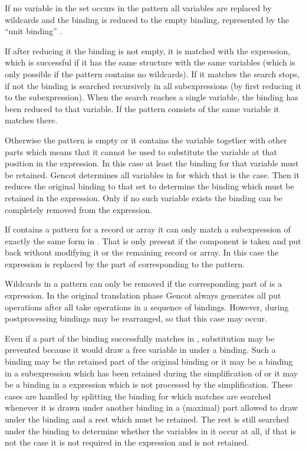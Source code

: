 If no variable in the set occurs in the pattern all variables are replaced by wildcards and the binding is reduced to the 
empty binding, represented by the ``unit binding'' \code{() = ()}.

If after reducing it the binding is not empty, it is matched with the expression, which is successful if it has the same structure with the same
variables (which is only possible if the pattern contains no wildcards). If it matches the search stops, if not the binding 
is searched recursively in all subexpressions (by first reducing it to the subexpression). When the search reaches a single 
variable, the binding has been reduced to that variable. If the pattern consists of the same variable it matches there.

Otherwise the pattern is empty or it contains the variable together with other parts which means that it cannot be used to substitute the 
variable at that position in the expression. In this case at least the binding for that variable must be retained. Gencot 
determines all variables in  for which that is the case. Then it reduces the original binding 
to that set to determine the binding  which must be retained in the  expression. Only if no
such variable exists the binding can be completely removed from the  expression.

If  contains a  pattern for a record or array it can only match a  subexpression 
of exactly the same form in . That is only present if the component is taken and put back without modifying it or the 
remaining record or array. In this case the  expression is replaced by the part of  corresponding to 
the  pattern.

Wildcards in a  pattern can only be removed if the corresponding part of  is a  expression. 
In the original translation phase Gencot always generates all put operations after all take operations in a sequence of bindings.
However, during postprocessing bindings may be rearranged, so that this case may occur.

Even if a part of the binding successfully matches in , substitution may be prevented because it would draw a 
free variable in  under a binding. Such a binding may be the retained part of the original binding or it may 
be a binding in a  subexpression which has been retained during the simplification of 
or it may be a binding in a  expression which is not processed by the simplification. These cases are handled
by splitting the binding for which matches are searched whenever it is drawn under another binding in a (maximal) part allowed
to draw under the binding and a rest which must be retained. The rest is still searched under the binding to determine whether
the variables in it occur at all, if that is not the case it is not required in the expression and is not retained.

